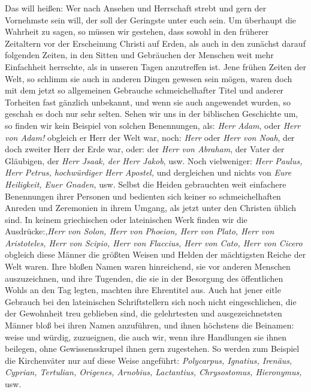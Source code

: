 Das will heißen: Wer nach Ansehen und
Herrschaft strebt und gern der Vornehmste sein will, der soll der Geringste
unter euch sein. Um überhaupt die Wahrheit zu sagen, so müssen wir gestehen,
dass
sowohl in den früherer Zeitaltern vor der Erscheinung Christi auf Erden, als
auch in den zunächst darauf folgenden Zeiten, in den Sitten und Gebräuchen der
Menschen weit mehr Einfachheit herrschte, als in unseren Tagen anzutreffen ist.
Jene frühen Zeiten der Welt, so schlimm sie auch in anderen Dingen gewesen sein
mögen, waren doch mit dem jetzt so allgemeinen Gebrauche schmeichelhafter Titel
und anderer Torheiten fast gänzlich unbekannt, und wenn sie auch angewendet
wurden, so geschah es doch nur sehr selten. Sehen wir uns in der biblischen
Geschichte um, so finden wir kein Beispiel von solchen Benennungen, als:
\textit{Herr
Adam}, oder \textit{Herr von Adam!} obgleich er Herr der Welt war, noch:
\textit{Herr} oder
\textit{Herr von Noah}, der doch zweiter Herr der Erde war, oder: der
\textit{Herr von Abraham},
der Vater der Gläubigen, der \textit{Herr Jsaak, der Herr Jakob}, usw. Noch
vielweniger: \textit{Herr Paulus, Herr Petrus, hochwürdiger Herr Apostel,} und
dergleichen und
nichts von \textit{Eure Heiligkeit, Euer Gnaden,} usw. Selbst die Heiden
gebrauchten
weit einfachere Benennungen ihrer Personen und bedienten sich keiner so
schmeichelhaften Anreden und Zeremonien in ihrem Umgang, als jetzt unter den
Christen üblich sind. In keinem griechischen oder lateinischen Werk finden wir
die Ausdrücke:,\textit{Herr von Solon, Herr von Phoeion, Herr von Plato, Herr
von
Aristoteles, Herr von Scipio, Herr von Flaccius, Herr von Cato, Herr von Cicero}
obgleich diese Männer die größten Weisen und Helden der mächtigsten Reiche der
Welt waren. Ihre bloßen Namen waren hinreichend, sie vor anderen Menschen
auszuzeichnen, und ihre Tugenden, die sie in der Besorgung des öffentlichen
Wohls an den Tag legten, machten ihre Ehrentitel aus. Auch hat jener eitle
Gebrauch bei den lateinischen Schriftstellern sich noch nicht eingeschlichen,
die der Gewohnheit treu geblieben sind, die gelehrtesten und ausgezeichnetsten
Männer bloß bei ihren Namen anzuführen, und ihnen höchstens die Beinamen: weise
und würdig, zuzueignen, die auch wir, wenn ihre Handlungen sie ihnen beilegen,
ohne Gewissensskrupel ihnen gern zugestehen. So werden zum Beispiel die
Kirchenväter
nur auf diese Weise angeführt:
\textit{Polycarpus,
Ignatius, Irenäus,
Cyprian,
Tertulian, Origenes,
Arnobius, Lactantius,
Chrysostomus,
Hieronymus,} usw.

